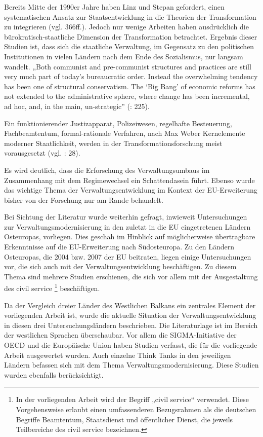 \par
Bereits Mitte der 1990er Jahre haben Linz und Stepan gefordert, einen systematischen Ansatz zur Staatsentwicklung in die Theorien der Transformation zu integrieren (vgl. \cite{linz} 366ff.). Jedoch nur wenige Arbeiten haben ausdrücklich die bürokratisch-staatliche Dimension der Transformation betrachtet. Ergebnis dieser Studien ist, dass sich die staatliche Verwaltung, im Gegensatz zu den politischen Institutionen in vielen Ländern nach dem Ende des Sozialismus, nur langsam wandelt. „Both communist and pre-communist structures and practices are still very much part of today’s bureaucratic order. Instead the overwhelming tendency has been one of structural conservatism. The ‘Big Bang’ of economic reforms has not extended to the administrative sphere, where change has been incremental, ad hoc, and, in the main, un-strategic” (\cite{dimgoe}: 225). 
\par
Ein funktionierender Justizapparat, Polizeiwesen, regelhafte Besteuerung, Fachbeamtentum, formal-rationale Verfahren, nach Max Weber Kernelemente moderner Staatlichkeit, werden in der Transformationsforschung meist vorausgesetzt (vgl. \cite{hens09}: 28).
\par
Es wird deutlich, dass die Erforschung des Verwaltungsumbaus im Zusammenhang mit dem Regimewechsel ein Schattendasein führt. Ebenso wurde das wichtige Thema der Verwaltungsentwicklung im Kontext der EU-Erweiterung bisher von der Forschung nur am Rande behandelt.
\par
Bei Sichtung der Literatur wurde weiterhin gefragt, inwieweit Untersuchungen zur Verwaltungsmodernisierung in den zuletzt in die EU eingetretenen Ländern Osteuropas, vorliegen. Dies geschah im Hinblick auf möglicherweise übertragbare Erkenntnisse auf die EU-Erweiterung nach Südosteuropa. Zu den Ländern Osteuropas, die 2004 bzw. 2007 der EU beitraten, liegen einige Untersuchungen vor, die sich auch mit der Verwaltungsentwicklung beschäftigen. Zu diesem Thema sind mehrere Studien erschienen, die sich vor allem mit der Ausgestaltung des civil service \footnote{In der vorliegenden Arbeit wird der Begriff „civil service“ verwendet. Diese Vorgehensweise erlaubt einen umfassenderen Bezugsrahmen als die deutschen Begriffe Beamtentum, Staatsdienst und öffentlicher Dienst, die jeweils Teilbereiche des civil service bezeichnen.} beschäftigen.
\par
Da der Vergleich dreier Länder des Westlichen Balkans ein zentrales Element der vorliegenden Arbeit ist, wurde die aktuelle Situation der Verwaltungsentwicklung in diesen drei Untersuchungsländern beschrieben. Die Literaturlage ist im Bereich der westlichen Sprachen überschaubar. Vor allem die SIGMA-Initiative der OECD und die Europäische Union haben Studien verfasst, die für die vorliegende Arbeit ausgewertet wurden. Auch einzelne Think Tanks in den jeweiligen Ländern befassen sich mit dem Thema Verwaltungsmodernisierung. Diese Studien wurden ebenfalls berücksichtigt.
